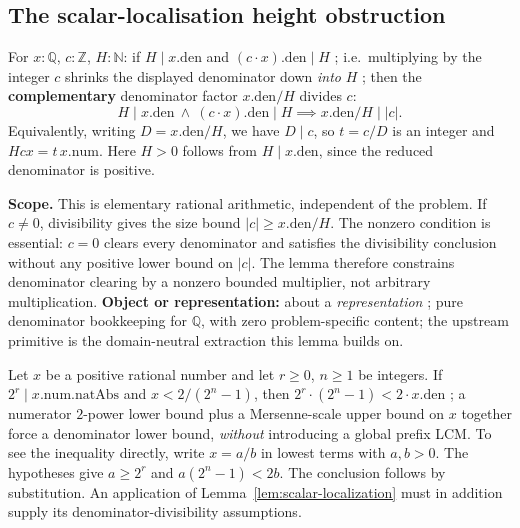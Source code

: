 \subsection{The scalar-localisation height obstruction}

\begin{lem}
\label{lem:scalar-localization}
For $x:\mathbb Q$, $c:\mathbb Z$, $H:\mathbb N$: if $H\mid x.\mathrm{den}$ and
$(c\cdot x).\mathrm{den}\mid H$ ;  i.e.\ multiplying by the integer $c$ shrinks the displayed
denominator down \emph{into} $H$ ;  then the \textbf{complementary} denominator factor
$x.\mathrm{den}/H$ divides $c$:
\[
  H\mid x.\mathrm{den} \ \land\ (c\cdot x).\mathrm{den}\mid H \implies x.\mathrm{den}/H \mid |c|.
\]
Equivalently, writing $D=x.\mathrm{den}/H$, we have $D\mid c$,
so $t=c/D$ is an integer and $Hcx=t\,x.\mathrm{num}$.
Here $H>0$ follows from $H\mid x.\mathrm{den}$, since the
reduced denominator is positive.

\textbf{Scope.} This is elementary rational arithmetic, independent
of the problem.  If $c\ne0$, divisibility gives the size bound
$|c|\ge x.\mathrm{den}/H$.  The nonzero condition is essential:
$c=0$ clears every denominator and satisfies the divisibility
conclusion without any positive lower bound on $|c|$.  The lemma
therefore constrains denominator clearing by a nonzero bounded
multiplier, not arbitrary multiplication.
\textbf{Object or representation:} about a
\emph{representation} ;  pure denominator bookkeeping for $\mathbb Q$, with zero problem-specific
content; the upstream primitive
is the domain-neutral extraction this lemma builds on.
\end{lem}

\begin{cor}
\label{cor:mersenne-height}
Let $x$ be a positive rational number and let $r\ge0$, $n\ge1$
be integers.  If $2^r\mid x.\mathrm{num}.\mathrm{natAbs}$ and
$x<2/(2^n-1)$, then
$2^r\cdot(2^n-1) < 2\cdot x.\mathrm{den}$ ;  a numerator $2$-power lower bound plus a Mersenne-scale
upper bound on $x$ together force a denominator lower bound, \emph{without} introducing a global
prefix LCM.
To see the inequality directly, write $x=a/b$ in lowest terms
with $a,b>0$.  The hypotheses give $a\ge2^r$ and
$a(2^n-1)<2b$.  The conclusion follows by substitution.
An application of Lemma~\ref{lem:scalar-localization} must in
addition supply its denominator-divisibility assumptions.
\end{cor}

